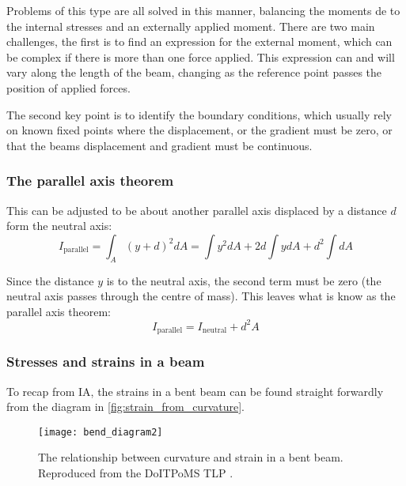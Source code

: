 Problems of this type are all solved in this manner, balancing the moments de to the internal stresses and an externally applied moment. There are two main challenges, the first is to find an expression for the external moment, which can be complex if there is more than one force applied. This expression can and will vary along the length of the beam, changing as the reference point passes the position of applied forces.

The second key point is to identify the boundary conditions, which usually rely on known fixed points where the displacement, or the gradient must be zero, or that the beams displacement and gradient must be continuous.









\subsubsection{The parallel axis theorem}


This can be adjusted to be about another parallel axis displaced by a distance $d$ form the neutral axis:
\begin{equation}
I_{\text{parallel}} = \int_A (y+d)^2dA = \int y^2 dA + 2 d \int y dA + d^2\int dA
\end{equation}

Since the distance $y$ is to the neutral axis, the second term must be zero (the neutral axis passes through the centre of mass). This leaves what is know as the parallel axis theorem:
\begin{equation}
I_{\text{parallel}} = I_{\text{neutral}} + d^2A
\end{equation}

\subsubsection{Stresses and strains in a beam}

To recap from IA, the strains in a bent beam can be found straight forwardly from the diagram in \autoref{fig:strain_from_curvature}.
\FloatBarrier
\begin{figure}[h!]
\centering
\texttt{[image: bend\_diagram2]}
\caption{The relationship between curvature and strain in a bent beam. Reproduced from the DoITPoMS TLP \cite{doitpoms_beams}.\label{fig:strain_from_curvature}}
\end{figure}
\FloatBarrier

